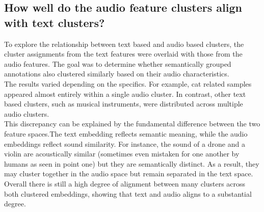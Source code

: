 \subsection{How well do the audio feature clusters align with text clusters?}
\label{sec:Text Features:c}

To explore the relationship between text based and audio based clusters, the cluster assignments from the text features were overlaid with those from the audio features. The goal was to determine whether semantically grouped annotations also clustered similarly based on their audio characteristics.\\
The results varied depending on the specifics. For example, cat related samples appeared almost entirely within a single audio cluster. In contrast, other text based clusters, such as musical instruments, were distributed across multiple audio clusters.\\
This discrepancy can be explained by the fundamental difference between the two feature spaces.The text embedding reflects semantic meaning, while the audio embeddings reflect sound similarity. For instance, the sound of a drone and a violin are acoustically similar (sometimes even mistaken for one another by humans as seen in point one) but they are semantically distinct. As a result, they may cluster together in the audio space but remain separated in the text space.\\
Overall there is still a high degree of alignment between many clusters across both clustered embeddings, showing that text and audio aligns to a substantial degree.


